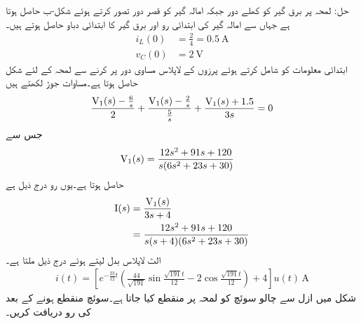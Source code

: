 حل: لمحہ  پر برق گیر کو کھلے دور جبکہ امالہ گیر کو قصر دور تصور کرتے ہوئے شکل-ب حاصل ہوتا ہے جہاں سے امالہ گیر کی ابتدائی رو  اور برق گیر کا ابتدائی دباو  حاصل ہوتے ہیں۔
\begin{align*}
i_L(0)&=\frac{2}{4}=\SI{0.5}{\ampere}\\
v_C(0)&=\SI{2}{\volt}
\end{align*}
ابتدائی معلومات کو شامل کرتے ہوئے پرزوں کے لاپلاس مساوی دور پر کرنے سے  لمحہ  کے لئے شکل حاصل ہوتا ہے۔مساوات جوڑ لکھتے ہیں
\begin{align*}
\frac{{{\textup{V}}}_1(s)-\frac{6}{s}}{2}+\frac{{{\textup{V}}}_1(s)-\frac{2}{s}}{\frac{5}{s}}+\frac{{{\textup{V}}}_1(s)+1.5}{3s}=0
\end{align*}
جس سے 
\begin{align*}
{\ensuremath{{\textup{V}}}}_1(s)&=\frac{12s^2+91s+120}{s(6s^2+23s+30)}
\end{align*}
حاصل ہوتا ہے۔یوں رو درج ذیل ہے
\begin{align*}
{\ensuremath{{\textup{I}}}}(s)&=\frac{{{\textup{V}}}_1(s)}{3s+4}\\
&=\frac{12s^2+91s+120}{s(s+4)(6s^2+23s+30)}
\end{align*}
الٹ لاپلاس بدل لیتے ہوئے درج ذیل ملتا ہے۔
\begin{align*}
i(t)=\left[e^{-\frac{23}{12}t}\left(\frac{44}{\sqrt{191}} \sin \frac{\sqrt{191} t}{12}-2\cos\frac{\sqrt{191} t}{12} \right)+4\right]u(t)\,\si{\ampere}
\end{align*}
شکل  میں ازل سے چالو سوئچ کو لمحہ  پر منقطع کیا جاتا ہے۔سوئچ منقطع ہونے کے بعد کی رو  دریافت کریں۔

